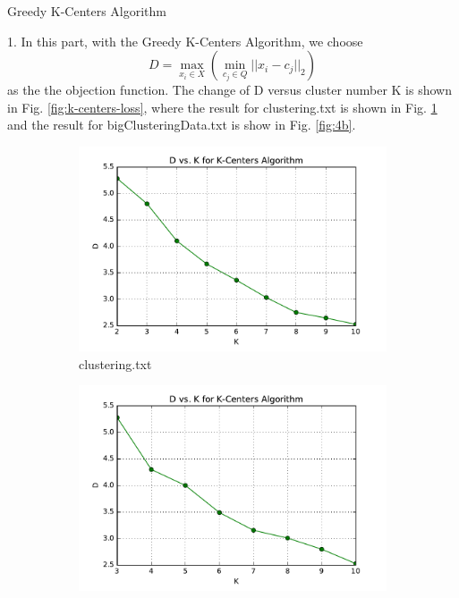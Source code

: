 \begin{description}
\begin{description}
\end{description}

\item[(\Romannum{2}).] Greedy K-Centers Algorithm

\begin{description}
\item{1.} In this part, with the Greedy K-Centers Algorithm, we choose 
$$D = \underset{x_i \in X}{\max}( \underset{c_j \in Q}{\min}{||x_i - c_j||_2})$$
as the the objection function. The change of D versus cluster number K is shown in Fig. \ref{fig:k-centers-loss}, where the result for clustering.txt is shown in Fig. \ref{fig:4a} and the result for bigClusteringData.txt is show in Fig. \ref{fig:4b}.

\begin{figure}[H]
\centering
\centering
        \begin{subfigure}[b]{0.49\textwidth}
            \centering
            \includegraphics[width=\textwidth]{./figures/loss_clustering_kCenter.pdf}
            \caption{clustering.txt}\label{fig:4a}
        \end{subfigure}
        \hfill
        \begin{subfigure}[b]{0.49\textwidth}  
            \centering 
            \includegraphics[width=\textwidth]{./figures/loss_bigClustering_kCenter.pdf}

\end{subfigure}
\end{figure}
\end{description}
\end{description}
